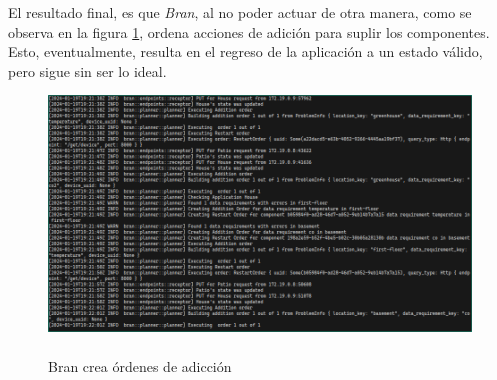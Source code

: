 El resultado final, es que \textit{Bran}, al no poder actuar de otra manera, como se observa en la figura \ref{fig:HadToAdd}, ordena acciones de adición para suplir los componentes. Esto, eventualmente, resulta en el regreso de la aplicación a un estado válido, pero sigue sin ser lo ideal.

\begin{figure}[ht]
    \centering
    \caption{\\Bran crea órdenes de adicción}
    \label{fig:HadToAdd}
    \includegraphics[width=0.9\linewidth]{images/ReLaunchIT.png}
    \vspace{-4mm}
\end{figure}
